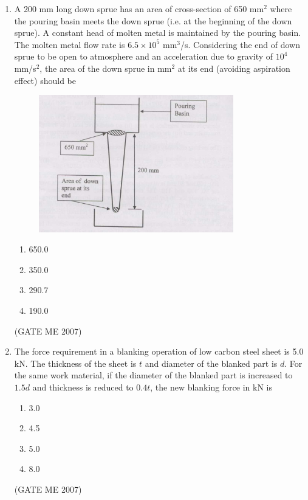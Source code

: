 \documentclass[journal]{IEEEtran}
\begin{document}
\begin{enumerate}
\item A 200 mm long down sprue has an area of cross-section of 650 mm\(^2\) where the pouring basin meets the down sprue (i.e. at the beginning of the down sprue). A constant head of molten metal is maintained by the pouring basin. The molten metal flow rate is \( 6.5 \times 10^5 \) mm\(^3\)/s. Considering the end of down sprue to be open to atmosphere and an acceleration due to gravity of \( 10^4 \) mm/s\(^2\), the area of the down sprue in mm\(^2\) at its end (avoiding aspiration effect) should be

\begin{figure}[H]
    \centering
    \includegraphics[width=0.8\textwidth]{Fig 9.png}
    \caption{}
    \label{fig:question65}
\end{figure}

\begin{multicols}{4}
\begin{enumerate}
\item 650.0
\item 350.0
\item 290.7
\item 190.0
\end{enumerate}
\end{multicols}
\hfill (GATE ME 2007)

\item The force requirement in a blanking operation of low carbon steel sheet is 5.0 kN. The thickness of the sheet is \( t \) and diameter of the blanked part is \( d \). For the same work material, if the diameter of the blanked part is increased to \( 1.5d \) and thickness is reduced to \( 0.4t \), the new blanking force in kN is
\begin{multicols}{4}
\begin{enumerate}
\item 3.0
\item 4.5
\item 5.0
\item 8.0
\end{enumerate}
\end{multicols}
\hfill (GATE ME 2007)


\end{enumerate}
\end{document}
